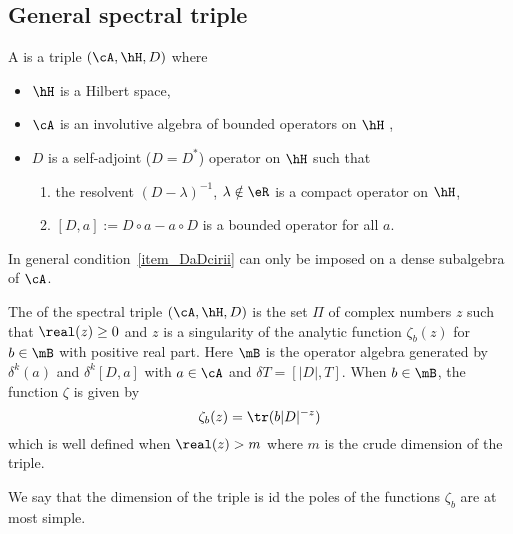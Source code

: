 \subsection{General spectral triple}
A  is a triple $(\cA,\hH,D)$ where
\begin{itemize}
	\item $\hH$ is a Hilbert space,
	\item $\cA$ is an involutive algebra of bounded operators on $\hH$ ,
	\item $D$ is a self-adjoint ($D=D^*$) operator on $\hH$ such that
	      \begin{enumerate}
		      \item the resolvent $(D-\lambda)^{-1}$, $\lambda\notin\eR$ is a compact operator on $\hH$,
		            \item\label{item_DaDcirii} $[D,a]:=D\circ a-a\circ D$ is a bounded operator for all $a$.
	      \end{enumerate}
\end{itemize}
In general condition~\ref{item_DaDcirii} can only be imposed on a dense subalgebra of $\cA$.

\begin{definition}	\label{DefDimSpec}
	The  of the spectral triple $(\cA,\hH,D)$ is the set $\Pi$ of complex numbers $z$ such that $\real(z)\geq 0$ and $z$ is a singularity of the analytic function $\zeta_b(z)$ for $b\in\mB$ with positive real part. Here $\mB$ is the operator algebra generated by $\delta^k(a)$ and $\delta^k[D,a]$ with $a\in \cA$ and $\delta T=[| D |,T]$. When $b\in\mB$, the function $\zeta$ is given by
	\[
		\zeta_b(z)=\tr(b| D |^{-z})
	\]
	which is well defined when $\real(z)>m$ where $m$ is the crude dimension of the triple.
\end{definition}

We say that the dimension of the triple is  id the poles of the functions $\zeta_b$ are at most simple.

